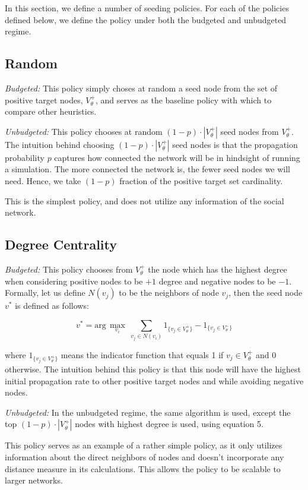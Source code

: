 In this section, we define a number of seeding policies. For each of the policies defined below, we define the policy under both the budgeted and unbudgeted regime. 

\subsection{Random} 
\textit{Budgeted:}
This policy simply choses at random a seed node from the set of positive target nodes, $V_\theta^+$, and serves as the baseline policy with which to compare other heuristics.

\textit{Unbudgeted:}
This policy chooses at random $(1-p) \cdot |V_\theta^+|$ seed nodes from $V_\theta^+$. The intuition behind choosing $(1-p) \cdot |V_\theta^+|$ seed nodes is that the propagation probability $p$ captures how connected the network will be in hindsight of running a simulation. The more connected the network is, the fewer seed nodes we will need. Hence, we take $(1-p)$ fraction of the positive target set cardinality. 

This is the simplest policy, and does not utilize any information of the social network. 

\subsection{Degree Centrality} 
\textit{Budgeted:}
This policy chooses from $V_\theta^+$ the node which has the highest degree when considering positive nodes to be $+1$ degree and negative nodes to be $-1$. Formally, let us define $N(v_j)$ to be the neighbors of node $v_j$, then the seed node $v^*$ is defined as follows: 

\begin{equation}
	v^* = \text{arg}\,\max\limits_{v_i}\  \sum_{v_j \in N(v_i)} 1_{\{v_j \in V_\theta^+\}} - 1_{\{v_j \in V_\theta^-\}}
\end{equation}

where $1_{\{v_j \in V_\theta^+\}}$ means the indicator function that equals 1 if $v_j \in V_\theta^+$ and 0 otherwise. The intuition behind this policy is that this node will have the highest initial propagation rate to other positive target nodes and while avoiding negative nodes.

\textit{Unbudgeted:}
In the unbudgeted regime, the same algorithm is used, except the top $(1-p) \cdot |V_\theta^+|$ nodes with highest degree is used, using equation 5.

This policy serves as an example of a rather simple policy, as it only utilizes information about the direct neighbors of nodes and doesn't incorporate any distance measure in its calculations. This allows the policy to be scalable to larger networks.

